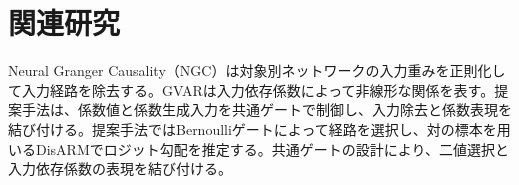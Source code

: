 \section{関連研究}
\label{sec:related}
Neural Granger Causality（NGC）は対象別ネットワークの入力重みを正則化して入力経路を除去する\citep{tank2022}。GVARは入力依存係数によって非線形な関係を表す\citep{marcinkevics2021}。提案手法は、係数値と係数生成入力を共通ゲートで制御し、入力除去と係数表現を結び付ける。提案手法ではBernoulliゲートによって経路を選択し、対の標本を用いるDisARM\citep{dong2020}でロジット勾配を推定する。共通ゲートの設計により、二値選択と入力依存係数の表現を結び付ける。
